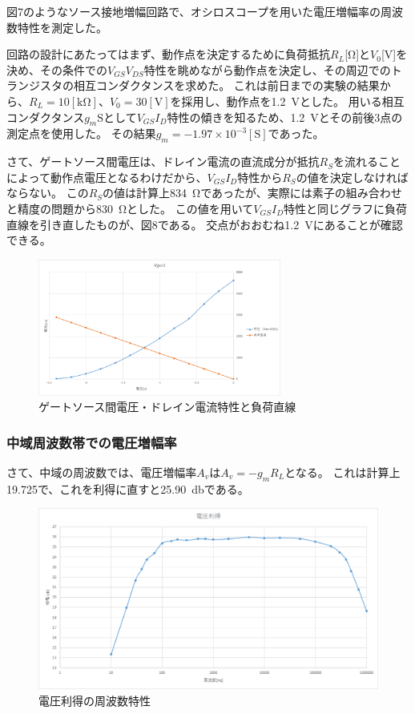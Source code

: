 \documentclass[10pt,a4j,dvipdfmx]{jsarticle}
\begin{document}
図7のようなソース接地増幅回路で、オシロスコープを用いた電圧増幅率の周波数特性を測定した。

回路の設計にあたってはまず、動作点を決定するために負荷抵抗$R_L$[\si{\ohm}]と$V_0$[\si{\volt}]を決め、その条件での$V_{GS}V_{DS}$特性を眺めながら動作点を決定し、その周辺でのトランジスタの相互コンダクタンスを求めた。
これは前日までの実験の結果から、$R_L=10[\si{\kilo\ohm}]$、$V_0=30[\si{\volt}]$を採用し、動作点を\SI{1.2}{\volt}とした。
用いる相互コンダクタンス$g_m\si{\siemens}$として$V_{GS}I_{D}$特性の傾きを知るため、\SI{1.2}{\volt}とその前後3点の測定点を使用した。
その結果$g_m = -1.97\times10^{-3}[\si{\siemens}]$であった。

さて、ゲートソース間電圧は、ドレイン電流の直流成分が抵抗$R_S$を流れることによって動作点電圧となるわけだから、$V_{GS}$$I_{D}$特性から$R_S$の値を決定しなければならない。
この$R_S$の値は計算上\SI{834}{\ohm}であったが、実際には素子の組み合わせと精度の問題から\SI{830}{\ohm}とした。
この値を用いて$V_{GS}$$I_{D}$特性と同じグラフに負荷直線を引き直したものが、図8である。
交点がおおむね\SI{1.2}{\volt}にあることが確認できる。

\begin{figure}[H]
  \centering
  \includegraphics[width=8cm]{VgsId.png}
  \caption{ゲートソース間電圧・ドレイン電流特性と負荷直線}
\end{figure}
\subsubsection{中域周波数帯での電圧増幅率}
さて、中域の周波数では、電圧増幅率$A_v$は$A_v=-g_m R_L$となる。
これは計算上19.725で、これを利得に直すと\SI{25.90}{\decibel}である。

\begin{figure}[H]
  \centering
  \includegraphics[width=15cm]{Gain.png}
  \caption{電圧利得の周波数特性}
\end{figure}
\end{document}
